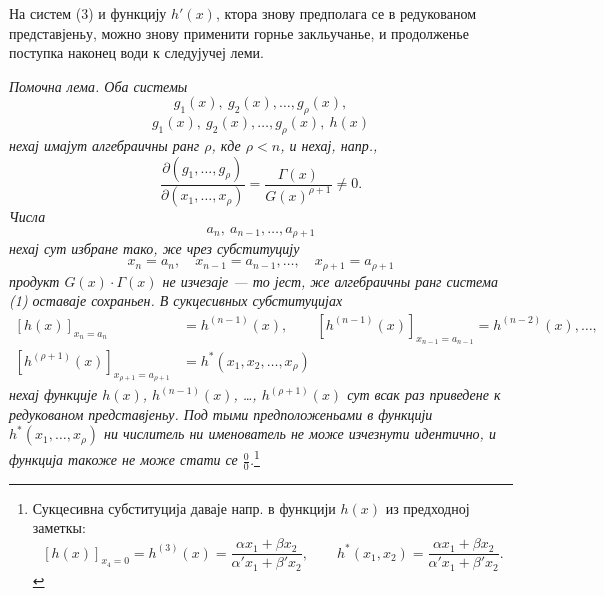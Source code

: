 ﻿\documentclass[11pt]{article}
\begin{document}
На систем (3) и функцију $h'(x)$, ктора знову предполага се в редукованом представјеньу, можно знову применити горнье закльучанье, и продолженье поступка наконец води к следујучеј леми.

{\itshape Помочна лема. Оба системы}
\[
  g_1(x),\ g_2(x),\ldots,g_\rho(x),
\]
\[
  g_1(x),\ g_2(x),\ldots,g_\rho(x),\ h(x)
\]
{\itshape нехај имајут алгебраичны ранг $\rho$, кде $\rho<n$, и нехај, напр.,}
\[
 \frac{\partial(g_1,\ldots,g_\rho)}{\partial(x_1,
\ldots,x_\rho)}
 =\frac{\Gamma(x)}{G(x)^{\rho+1}}\ne0.
\]
{\itshape Числа}
\[
  a_n,\ a_{n-1},\ldots,a_{\rho+1}
\]
{\itshape нехај сут избране тако, же чрез субституцију}
\[
  x_n=a_n,\quad x_{n-1}=a_{n-1},\ldots,\quad x_{\rho+1}=a_{\rho+1}
\]
{\itshape продукт $G(x)\cdot\Gamma(x)$ не изчезаје --- то јест, же алгебраичны ранг система (1) оставаје сохраньен. В сукцесивных субституцијах}
\[
\begin{aligned}
 [h(x)]_{x_n=a_n}&=h^{(n-1)}(x),\qquad
 [h^{(n-1)}(x)]_{x_{n-1}=a_{n-1}}=h^{(n-2)}(x),\ldots,\\
 [h^{(\rho+1)}(x)]_{x_{\rho+1}=a_{\rho+1}}&=h^*(x_1,x_2,\ldots,x_\rho)
\end{aligned}
\]
{\itshape нехај функције $h(x)$, $h^{(n-1)}(x)$, \ldots, $h^{(\rho+1)}(x)$ сут всак раз приведене к редукованом представјеньу. Под тыми предположеньами в функцији $h^*(x_1,\ldots,x_\rho)$ ни числитель ни именователь не може изчезнути идентично, и функција такоже не може стати се $\frac{0}{0}$.}\footnote{Сукцесивна субституција даваје напр. в функцији $h(x)$ из предходној заметкы:
\[
 [h(x)]_{x_4=0}=h^{(3)}(x)=\frac{\alpha x_1+\beta x_2}{\alpha' x_1+\beta' x_2},\qquad
 h^*(x_1,x_2)=\frac{\alpha x_1+\beta x_2}{\alpha' x_1+\beta' x_2}.
\]}
\end{document}
